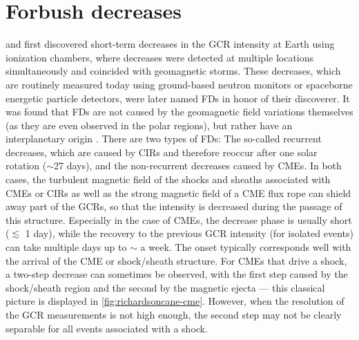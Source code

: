 \section{Forbush decreases}
\label{sec:forbush}

\citet{Forbush-1937} and \citet{Hess-1937} first discovered short-term decreases in the \ac{GCR} intensity at Earth using ionization chambers, where decreases were detected at multiple locations simultaneously and coincided with geomagnetic storms. These decreases, which are routinely measured today using ground-based neutron monitors or spaceborne energetic particle detectors, were later named \acp{FD} in honor of their discoverer. It was found that \acp{FD} are not caused by the geomagnetic field variations themselves (as they are even observed in the polar regions), but rather have an interplanetary origin \citep[see e.g.][and references therein]{Lockwood1971}. There are two types of \acp{FD}: The so-called recurrent decreases, which are caused by \acp{CIR} and therefore reoccur after one solar rotation ($\sim$27 days), and the non-recurrent decreases caused by \acp{CME}. In both cases, the turbulent magnetic field of the shocks and sheaths associated with \acp{CME} or \acp{CIR} as well as the strong magnetic field of a \ac{CME} flux rope can shield away part of the \acp{GCR}, so that the intensity is decreased during the passage of this structure.
Especially in the case of \acp{CME}, the decrease phase is usually short ($\lesssim$ 1 day), while the recovery to the previous \ac{GCR} intensity (for isolated events) can take multiple days up to $\sim$ a week. The onset typically corresponds well with the arrival of the \ac{CME} or shock/sheath structure. For \acp{CME} that drive a shock, a two-step decrease can sometimes be observed, with the first step caused by the shock/sheath region and the second by the magnetic ejecta --- this classical picture is displayed in \autoref{fig:richardsoncane-cme}. However, when the resolution of the \ac{GCR} measurements is not high enough, the second step may not be clearly separable for all events associated with a shock.
